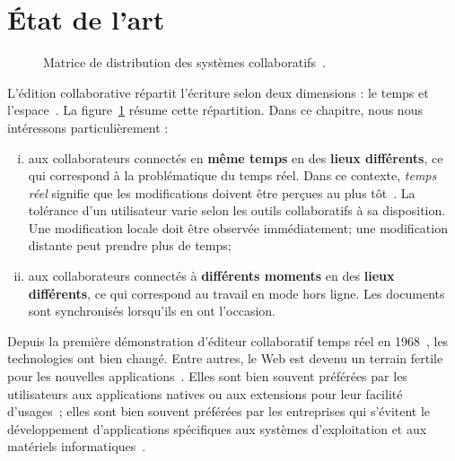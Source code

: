 
\section{État de l'art}
\label{editor:sec:stateoftheart}

\begin{figure}
  \begin{center}
    
    \caption[Matrice de distribution des systèmes collaboratifs] {
      \label{editor:fig:groupware} Matrice de distribution des systèmes
      collaboratifs~\cite{johansen1988groupware}.}
  \end{center}
\end{figure}


L'édition collaborative répartit l'écriture selon deux dimensions : le temps et
l'espace~\cite{desanctis1987foundation, grudin1994computersupported,
  johansen1988groupware}.  La figure~\ref{editor:fig:groupware} résume cette
répartition. Dans ce chapitre, nous nous intéressons particulièrement :
\begin{enumerate}[(i)]
\item aux collaborateurs connectés en \textbf{même temps} en des \textbf{lieux
    différents}, ce qui correspond à la problématique du temps réel. Dans ce
  contexte, \emph{temps réel} signifie que les modifications doivent être
  perçues au plus tôt~\cite{ellis1989concurrency}. La tolérance d'un utilisateur
  varie selon les outils collaboratifs à sa disposition. Une modification locale
  doit être observée immédiatement; une modification distante peut prendre plus
  de temps;
\item aux collaborateurs connectés à \textbf{différents moments} en des
  \textbf{lieux différents}, ce qui correspond au travail en mode hors
  ligne. Les documents sont synchronisés lorsqu'ils en ont l'occasion.
\end{enumerate}

Depuis la première démonstration d'éditeur collaboratif temps réel en
1968~\cite{engelbart1968research}, les technologies ont bien changé. Entre
autres, le Web est devenu un terrain fertile pour les nouvelles
applications~\cite{lautamaki2013development}. Elles sont bien souvent préférées
par les utilisateurs aux applications natives ou aux extensions pour leur
facilité d'usages~\cite{mogan2010impact}; elles sont bien souvent préférées par
les entreprises qui s'évitent le développement d'applications spécifiques aux
systèmes d'exploitation et aux matériels informatiques~\cite{mogan2010impact}.

